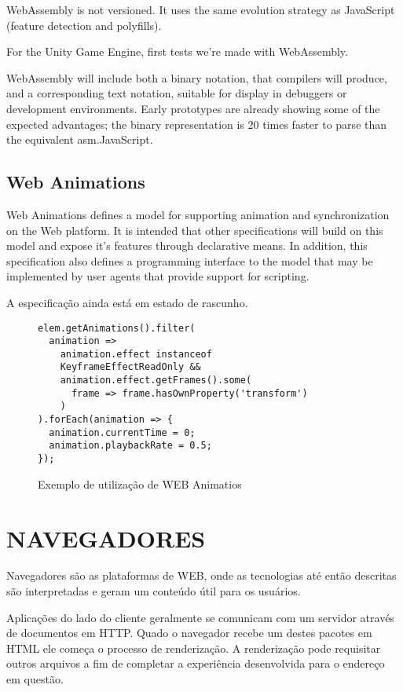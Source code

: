 WebAssembly is not versioned. It uses the same evolution strategy as JavaScript (feature detection and polyfills).

For the Unity Game Engine, first tests we're made with WebAssembly.

WebAssembly will include both a binary notation, that compilers will produce, and a corresponding text notation, suitable for display in debuggers or development environments. Early prototypes are already showing some of the expected advantages; the binary representation is 20 times faster to parse than the equivalent asm.JavaScript.

\subsection{Web Animations}

Web Animations defines a model for supporting animation and synchronization on the Web platform. It is intended that other specifications will build on this model and expose it's features through declarative means. In addition, this specification also defines a programming interface to the model that may be implemented by user agents that provide support for scripting.

A especificação ainda está em estado de rascunho.
\begin{figure}
    \centering
    \begin{verbatim}
elem.getAnimations().filter(
  animation =>
    animation.effect instanceof 
    KeyframeEffectReadOnly &&
    animation.effect.getFrames().some(
      frame => frame.hasOwnProperty('transform')
    )
).forEach(animation => {
  animation.currentTime = 0;
  animation.playbackRate = 0.5;
});
    \end{verbatim}
	\caption{Exemplo de utilização de WEB Animatios}
    \label{fig:webAnimations}
\end{figure}

\section{NAVEGADORES}
Navegadores são as plataformas de WEB, onde as tecnologias até então
descritas são interpretadas e geram um conteúdo útil para os usuários.

Aplicações do lado do cliente geralmente se comunicam com um
servidor através de documentos em HTTP. Quado o navegador recebe um
destes pacotes em HTML ele começa o processo de renderização. A
renderização pode requisitar outros arquivos a fim de completar a
experiência desenvolvida para o endereço em questão.

